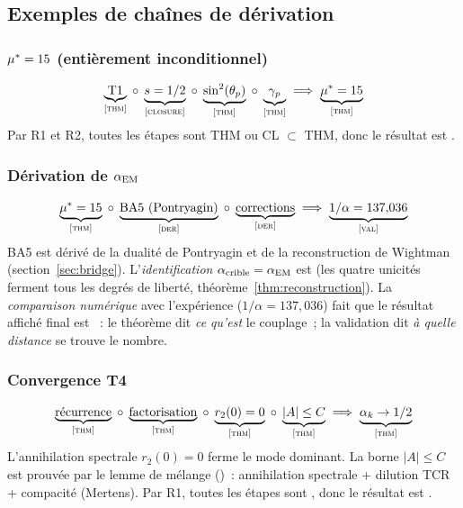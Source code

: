 \documentclass[12pt,a4paper]{article}
\begin{document}
\subsection{Exemples de chaînes de dérivation}
\label{sec:app_d_examples}

\subsubsection{${\mu^{*}} = 15$ (entièrement inconditionnel)}

\[
  \underbrace{\text{T1}}_{\textnormal{\textsc{[thm]}}} \;\circ\;
  \underbrace{s = 1/2}_{\textnormal{\textsc{[closure]}}} \;\circ\;
  \underbrace{\sin^2(\theta_{p})}_{\textnormal{\textsc{[thm]}}} \;\circ\;
  \underbrace{\gamma_{p}}_{\textnormal{\textsc{[thm]}}}
  \;\Longrightarrow\; \underbrace{{\mu^{*}} = 15}_{\textnormal{\textsc{[thm]}}}
\]
Par R1 et R2, toutes les étapes sont THM ou CL $\subset$ THM,
donc le résultat est \THMTAG.

\subsubsection{Dérivation de $\alpha_{\mathrm{EM}}$}

\[
  \underbrace{{\mu^{*}} = 15}_{\textnormal{\textsc{[thm]}}} \;\circ\;
  \underbrace{\text{BA5 (Pontryagin)}}_{\textnormal{\textsc{[der]}}} \;\circ\;
  \underbrace{\text{corrections}}_{\textnormal{\textsc{[der]}}}
  \;\Longrightarrow\; \underbrace{1/\alpha = 137{,}036}_{\textnormal{\textsc{[val]}}}
\]
BA5 est dérivé de la dualité de Pontryagin et de la reconstruction
de Wightman (section~\ref{sec:bridge}). L'\emph{identification}
$\alpha_{\rm crible} = \alpha_{\mathrm{EM}}$ est \THMTAG{} (les quatre unicités
ferment tous les degrés de liberté,
théorème~\ref{thm:reconstruction}). La \emph{comparaison numérique}
avec l'expérience ($1/\alpha = 137{,}036$) fait que le résultat
affiché final est \VALTAG~: le théorème dit \emph{ce qu'est} le
couplage~; la validation dit \emph{à quelle distance} se trouve le
nombre.

\subsubsection{Convergence T4}

\[
  \underbrace{\text{récurrence}}_{\textnormal{\textsc{[thm]}}} \;\circ\;
  \underbrace{\text{factorisation}}_{\textnormal{\textsc{[thm]}}} \;\circ\;
  \underbrace{r_2(0) = 0}_{\textnormal{\textsc{[thm]}}} \;\circ\;
  \underbrace{|A| \leq C}_{\textnormal{\textsc{[thm]}}}
  \;\Longrightarrow\; \underbrace{\alpha_k \to 1/2}_{\textnormal{\textsc{[thm]}}}
\]
L'annihilation spectrale $r_2(0) = 0$ ferme le mode dominant. La
borne $|A| \leq C$ est prouvée par le lemme de mélange
(\cite{companion_M3})~: annihilation spectrale + dilution TCR +
compacité (Mertens). Par R1, toutes les étapes sont \THMTAG, donc
le résultat est \THMTAG.
\end{document}
